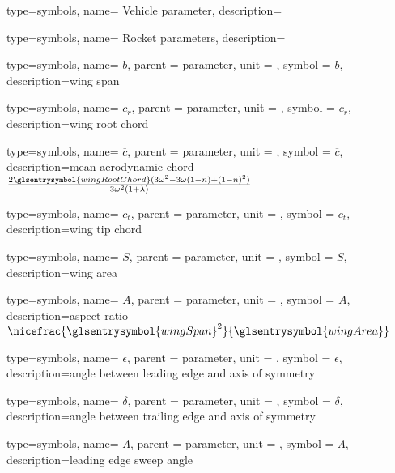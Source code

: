 {type=symbols,
  name= {Vehicle parameter},
  description={}
}

{type=symbols,
  name= {Rocket parameters},
  description={}
}


{type=symbols,
  name= \ensuremath{b},
  parent = {parameter},
  unit = \unexpanded{\si{\meter}},
  symbol = \ensuremath{b},
  description={wing span}
}

{type=symbols,
  name= \ensuremath{c_{r}},
  parent = {parameter},
  unit = \unexpanded{\si{\meter}},
  symbol = \ensuremath{c_{r}},
  description={wing root chord}
}

{type=symbols,
name= \ensuremath{\overline{c}},
parent = {parameter},
unit = \unexpanded{\si{\meter}},
symbol = \ensuremath{\overline{c}},
description={mean aerodynamic chord $\frac{2\glsentrysymbol{wingRootChord}(3\omega^2 - 3\omega(1-n) + (1-n)^2) }{3\omega^2(1+\lambda)}$}
  }

{type=symbols,
  name= \ensuremath{c_{t}},
  parent = {parameter},
  unit = \unexpanded{\si{\meter}},
  symbol = \ensuremath{c_{t}},
  description={wing tip chord}
}

{type=symbols,
  name= \ensuremath{S},
  parent = {parameter},
  unit = \unexpanded{\si{\meter\squared}},
  symbol = \ensuremath{S},
  description={wing area}
}

{type=symbols,
  name= \ensuremath{A},
  parent = {parameter},
  unit = \unexpanded{},
  symbol = \ensuremath{A },
  description={aspect ratio $\nicefrac{\glsentrysymbol{wingSpan}^2}{\glsentrysymbol{wingArea}}$}
}

{type=symbols,
  name= \ensuremath{\epsilon},
  parent = {parameter},
  unit = \unexpanded{\si{\radian}},
  symbol = \ensuremath{\epsilon},
  description={angle between leading edge and axis of symmetry}
}


{type=symbols,
  name= \ensuremath{\delta},
  parent = {parameter},
  unit = \unexpanded{\si{\radian}},
  symbol = \ensuremath{\delta},
  description={angle between trailing edge and axis of symmetry}
}

{type=symbols,
  name= \ensuremath{\Lambda},
  parent = {parameter},
  unit = \unexpanded{\si{\radian}},
  symbol = \ensuremath{\Lambda},
  description={leading edge sweep angle}
}


